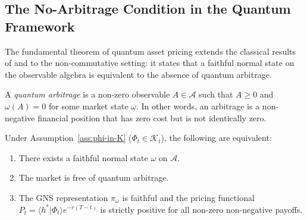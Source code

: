 \subsection{The No-Arbitrage Condition in the Quantum Framework}

The fundamental theorem of quantum asset pricing extends the classical results of
\citet{harrison1979martingales} and \citet{delbaen1994general} to the non-commutative
setting: it states that a faithful normal state on the observable algebra is
equivalent to the absence of quantum arbitrage.

\begin{definition}\label{def:quantum-arbitrage}
A \emph{quantum arbitrage} is a non-zero observable $A \in \mathcal{A}$ such that
$A \geq 0$ and $\omega(A) = 0$ for some market state $\omega$. In other words, an
arbitrage is a non-negative financial position that has zero cost but is not
identically zero.
\end{definition}

\begin{theorem}\label{thm:fundamental}
Under Assumption~\ref{ass:phi-in-K} ($\Phi_t \in \mathcal{K}_t$), the following
are equivalent:
\begin{enumerate}
    \item[(i)] There exists a faithful normal state $\omega$ on $\mathcal{A}$.
    \item[(ii)] The market is free of quantum arbitrage.
    \item[(iii)] The GNS representation $\pi_\omega$ is faithful and the pricing
        functional $P_t = \langle h^* | \Phi_t \rangle e^{-r(T-t)}$ is strictly
        positive for all non-zero non-negative payoffs.
\end{enumerate}
\end{theorem}

